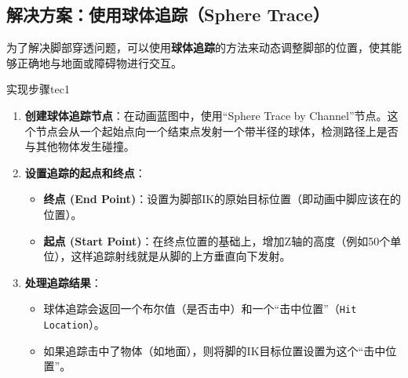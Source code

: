 \documentclass[math,code,12pt]{amznotes}
\newcommand{\il}[1]{\texttt{#1}}%
\begin{document}
    \subsection{解决方案：使用球体追踪（Sphere Trace）}
    为了解决脚部穿透问题，可以使用\textbf{球体追踪}的方法来动态调整脚部的位置，使其能够正确地与地面或障碍物进行交互。
    
    \begin{tecbox}{实现步骤}{tec1}
    \begin{enumerate}
        \item \textbf{创建球体追踪节点}：在动画蓝图中，使用“Sphere Trace by Channel”节点。这个节点会从一个起始点向一个结束点发射一个带半径的球体，检测路径上是否与其他物体发生碰撞。
    
        \item \textbf{设置追踪的起点和终点}：
        \begin{itemize}
            \item \textbf{终点 (End Point)}：设置为脚部IK的原始目标位置（即动画中脚应该在的位置）。
            \item \textbf{起点 (Start Point)}：在终点位置的基础上，增加Z轴的高度（例如50个单位），这样追踪射线就是从脚的上方垂直向下发射。
        \end{itemize}
    
        \item \textbf{处理追踪结果}：
        \begin{itemize}
            \item 球体追踪会返回一个布尔值（是否击中）和一个“击中位置”（\il{Hit Location}）。
            \item 如果追踪击中了物体（如地面），则将脚的IK目标位置设置为这个“击中位置”。
        \end{itemize}
    \end{enumerate}
    \end{tecbox}
\end{document}
